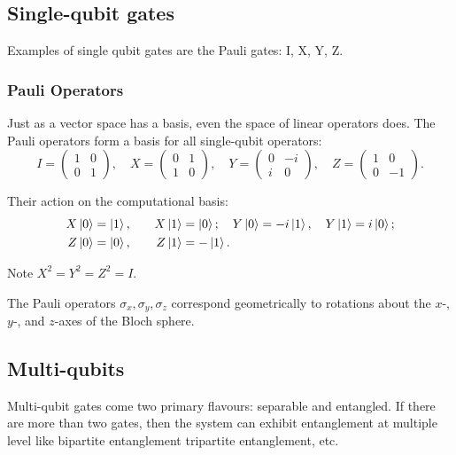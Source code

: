 \documentclass[12pt, a4paper, oneside]{report}
\theoremstyle{plain}
\theoremstyle{definition}
\theoremstyle{remark}
\begin{document}

\subsection{Single-qubit gates}
Examples of single qubit gates are the Pauli gates: I, X, Y, Z.
\subsubsection{Pauli Operators}

Just as a vector space has a basis, even the space of linear operators does. The Pauli operators form a basis for all single-qubit operators:
\[
  I = \begin{pmatrix}1&0\\0&1\end{pmatrix},\quad
  X = \begin{pmatrix}0&1\\1&0\end{pmatrix},\quad
  Y = \begin{pmatrix}0&-i\\i&0\end{pmatrix},\quad
  Z = \begin{pmatrix}1&0\\0&-1\end{pmatrix}.
\]

Their action on the computational basis:
\begin{alignat*}{2}
  X\ket{0} &= \ket{1}, &\quad X\ket{1} &= \ket{0};\quad
  Y\ket{0} = -i\ket{1}, \quad Y\ket{1} = i\ket{0};\\
  Z\ket{0} &= \ket{0}, &\quad Z\ket{1} &= -\ket{1}.
\end{alignat*}

Note $X^2 = Y^2 = Z^2 = I$.

The Pauli operators $\sigma_x, \sigma_y, \sigma_z$ correspond geometrically to rotations about the $x$-, $y$-, and $z$-axes of the Bloch sphere.

\subsection{Multi-qubits}
Multi-qubit gates come two primary flavours: separable and entangled. If there are more than two gates, then the system can exhibit entanglement at multiple level like bipartite entanglement tripartite entanglement, etc.
\end{document}

